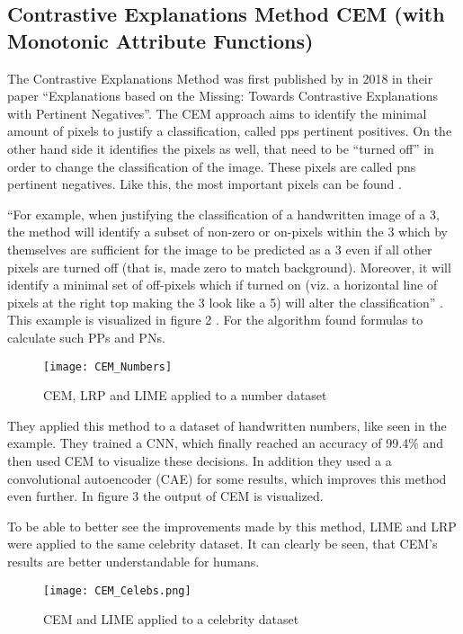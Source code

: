 \subsection{Contrastive Explanations Method CEM (with Monotonic Attribute Functions)}
The Contrastive Explanations Method was first published by  in 2018 in their paper “Explanations based on the Missing: Towards Contrastive Explanations with Pertinent Negatives”.
The CEM approach aims to identify the minimal amount of pixels to justify a classification, called \glspl{pp} pertinent positives. On the other hand side it identifies the pixels as well, that need to be “turned off” in order to change the classification of the image. These pixels are called \glspl{pn} pertinent negatives. Like this, the most important pixels can be found . 
\par
“For example, when justifying the classification of a handwritten image of a 3, the method will identify a subset of non-zero or on-pixels within the 3 which by themselves are sufficient for the image to be predicted as a 3 even if all other pixels are turned off (that is, made zero to match background). Moreover, it will identify a minimal set of off-pixels which if turned on (viz. a horizontal line of pixels at the right top making the 3 look like a 5) will alter the classification” \cite[2]{Luss.}.
This example is visualized in figure 2 \cite{Dhurandhar.2018}.
For the algorithm  found formulas to calculate such PPs and PNs.
\begin{figure*}[h]
    \center
    \texttt{[image: CEM\_Numbers]}
    \caption{CEM, LRP and LIME applied to a number dataset}
\end{figure*}
They applied this method to a dataset of handwritten numbers, like seen in the example. They trained a CNN, which finally reached an accuracy of 99.4\% and then used CEM to visualize these decisions. In addition they used a a convolutional autoencoder (CAE) for some results, which improves this method even further. In figure 3 the output of CEM is visualized. 
\par
To be able to better see the improvements made by this method, LIME and LRP were applied to the same celebrity dataset. It can clearly be seen, that CEM's results are better understandable for humans.
\begin{figure*}[h]
    \center
    \texttt{[image: CEM\_Celebs.png]}
    \caption{CEM and LIME applied to a celebrity dataset}
\end{figure*}

